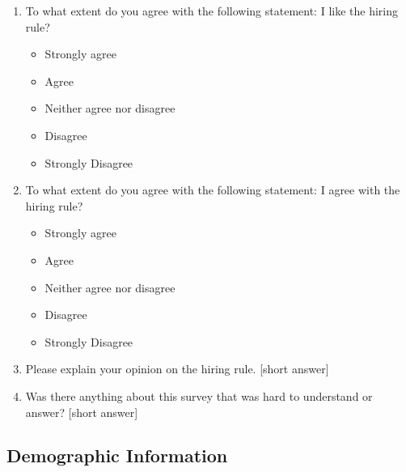 \documentclass{article}
\begin{document}
\begin{enumerate}
\item To what extent do you agree with the following statement: I like the hiring rule?
\begin{itemize}
    \item Strongly agree
    \item Agree
    \item Neither agree nor disagree
    \item Disagree
    \item Strongly Disagree
\end{itemize}

\item To what extent do you agree with the following statement: I agree with the hiring rule?
\begin{itemize}
    \item Strongly agree
    \item Agree
    \item Neither agree nor disagree
    \item Disagree
    \item Strongly Disagree
\end{itemize}

\item Please explain your opinion on the hiring rule. [short answer]

\item Was there anything about this survey that was hard to understand or answer? [short answer]
\end{enumerate} 
\subsection{Demographic Information}\label{app:demographics}
\end{document}
